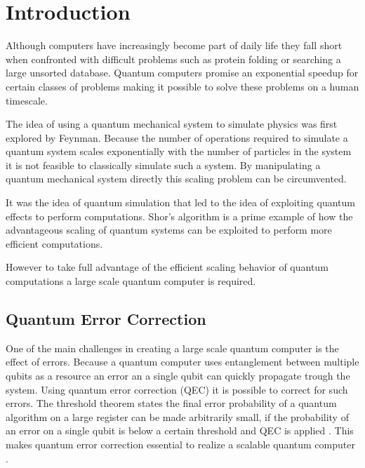 \chapter{Introduction}
Although computers have increasingly become part of daily life they fall short when confronted with difficult problems  such as protein folding or searching a large unsorted database.
Quantum computers promise an exponential speedup for certain classes of problems making it possible to solve these problems on a human timescale.

The idea of using a quantum mechanical system to simulate physics was first explored by Feynman\cite{Feynman1982Simulating}.
Because the number of operations required to simulate a quantum system scales exponentially with the number of particles in the system it is not feasible to classically simulate such a system.
By manipulating a quantum mechanical system directly this scaling problem can be circumvented.

It was the idea of quantum simulation that led to the idea of exploiting quantum effects to perform computations.
Shor's algorithm \citep{Shor1994Algorithms} is a prime example of how the advantageous scaling of quantum systems can be exploited to perform more efficient computations.

However to take full advantage of the efficient scaling behavior of quantum computations a large scale quantum computer is required.

\section{Quantum Error Correction}
One of the main challenges in creating a large scale quantum computer is the effect of errors.
Because a quantum computer uses entanglement between multiple qubits as a resource an error an a single qubit can quickly propagate trough the system.
Using quantum error correction (QEC) it is possible to correct for such errors.
The threshold theorem states the final error probability of a quantum algorithm on a large register can be made arbitrarily small, if the probability of an error on a single qubit is below a certain threshold and QEC is applied \citep{Mermin1990Extreme}.
This makes quantum error correction essential to realize a scalable quantum computer \citep{Nielsen2010Quantum}.


